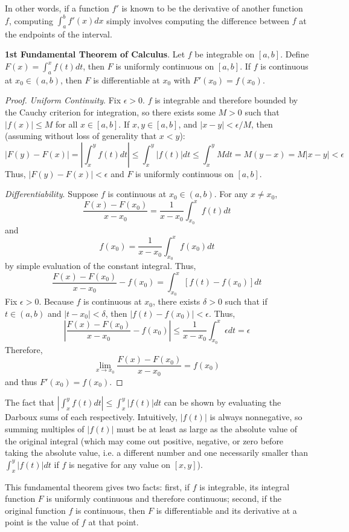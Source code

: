 In other words, if a function $f'$ is known to be the derivative of another function $f$, computing $\int_a^b f'(x)dx$ simply involves computing the difference between $f$ at the endpoints of the interval.

\newpage

\textbf{1st Fundamental Theorem of Calculus}. Let $f$ be integrable on $[a,b]$. Define $F(x)=\int_a^x f(t)dt$, then $F$ is uniformly continuous on $[a,b]$. If $f$ is continuous at $x_0\in(a,b)$, then $F$ is differentiable at $x_0$ with $F'(x_0) = f(x_0)$.

\begin{proof}
    \textit{Uniform Continuity}. Fix $\epsilon>0$. $f$ is integrable and therefore bounded by the Cauchy criterion for integration, so there exists some $M>0$ such that $|f(x)|\leq M$ for all $x\in[a,b]$.  If $x,y\in[a,b]$, and $|x-y|<\epsilon/M$, then (assuming without loss of generality that $x<y$): \[|F(y)-F(x)| = \left|\int_x^y f(t)dt\right| \leq \int_x^y |f(t)|dt\leq \int_x^y Mdt = M(y-x) = M|x-y| < \epsilon\] Thus, $|F(y)-F(x)|<\epsilon$ and $F$ is uniformly continuous on $[a,b]$.

    \textit{Differentiability}. Suppose $f$ is continuous at $x_0\in(a,b)$. For any $x\neq x_0$, \[\frac{F(x)-F(x_0)}{x-x_0} = \frac{1}{x-x_0}\int_{x_0}^x f(t)dt\] and \[f(x_0) = \frac{1}{x-x_0} \int_{x_0}^x f(x_0)dt\] by simple evaluation of the constant integral. Thus, \[\frac{F(x)-F(x_0)}{x-x_0} - f(x_0) = \int_{x_0}^x [f(t)-f(x_0)]dt\] Fix $\epsilon>0$. Because $f$ is continuous at $x_0$, there exists $\delta>0$ such that if $t\in(a,b)$ and $|t-x_0|<\delta$, then $|f(t)-f(x_0)|<\epsilon$. Thus, \[\left|\frac{F(x)-F(x_0)}{x-x_0} - f(x_0)\right| \leq \frac{1}{x-x_0}\int_{x_0}^x \epsilon dt = \epsilon\] Therefore, \[\lim_{x\to x_0}\frac{F(x)-F(x_0)}{x-x_0} = f(x_0)\] and thus $F'(x_0) = f(x_0)$.
\end{proof}

The fact that $\left|\int_x^y f(t)dt\right| \leq \int_x^y |f(t)|dt$ can be shown by evaluating the Darboux sums of each respectively. Intuitively, $|f(t)|$ is always nonnegative, so summing multiples of $|f(t)|$ must be at least as large as the absolute value of the original integral (which may come out positive, negative, or zero before taking the absolute value, i.e. a different number and one necessarily smaller than $\int_x^y |f(t)|dt$ if $f$ is negative for any value on $[x,y]$).

This fundamental theorem gives two facts: first, if $f$ is integrable, its integral function $F$ is uniformly continuous and therefore continuous; second, if the original function $f$ is continuous, then $F$ is differentiable and its derivative at a point is the value of $f$ at that point.
